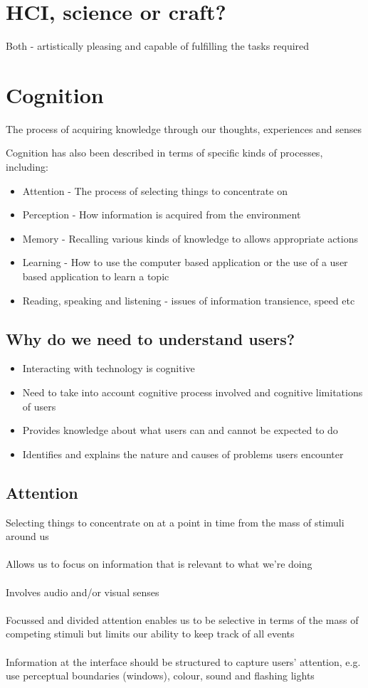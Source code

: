 \documentclass{article}[18pt]
\begin{document}
\section{HCI, science or craft?}
Both - artistically pleasing and capable of fulfilling the tasks required
\section{Cognition}
\begin{defin}[Cognition]
The process of acquiring knowledge through our thoughts, experiences and senses
\end{defin}
Cognition has also been described in terms of specific kinds of processes, including:
\begin{itemize}
	\item Attention - The process of selecting things to concentrate on
	\item Perception - How information is acquired from the environment
	\item Memory - Recalling various kinds of knowledge to allows appropriate actions
	\item Learning - How to use the computer based application or the use of a user based application to learn a topic
	\item Reading, speaking and listening - issues of information transience, speed etc
\end{itemize}
\subsection{Why do we need to understand users?}
\begin{itemize}
	\item Interacting with technology is cognitive
	\item Need to take into account cognitive process involved and cognitive limitations of users
	\item Provides knowledge about what users can and cannot be expected to do
	\item Identifies and explains the nature and causes of problems users encounter
\end{itemize}
\subsection{Attention}
Selecting things to concentrate on at a point in time from the mass of stimuli around us\\
\\
Allows us to focus on information that is relevant to what we're doing\\
\\
Involves audio and/or visual senses\\
\\
Focussed and divided attention enables us to be selective in terms of the mass of competing stimuli but limits our ability to keep track of all events\\
\\
Information at the interface should be structured to capture users' attention, e.g. use perceptual boundaries (windows), colour, sound and flashing lights
\end{document}
